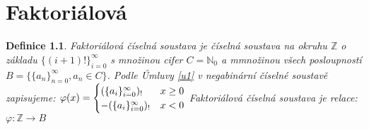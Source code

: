 \documentclass[12pt]{book}
\newtheorem{definice}{Definice}
\newtheorem*{pr}{Příklad}
\begin{document}





\chapter{Faktoriálová}

\begin{definice}
	Faktoriálová číselná soustava je číselná soustava na okruhu $\mathbb{Z}$ o základu $\{(i+1)!\}_{i=0}^\infty$ s množinou cifer $C=\mathbb{N}_0$ a mmnožinou všech posloupností
	$B=\{\{a_n\}_{n=0}^\infty,a_n \in C \}$.\newline
	Podle Úmluvy \ref{u1} v negabinární číselné soustavě zapisujeme:
	$\varphi(x) = 	\begin{cases} (\{a_i\}_{i=0}^{\infty})_! &x\ge0 \\
	-(\{a_i\}_{i=0}^{\infty})_! & x<0 \end{cases}$
	\newline
	Faktoriálová číselná soustava je relace:
	$\varphi:\mathbb{Z}\to B$
\end{definice}
\end{document}

